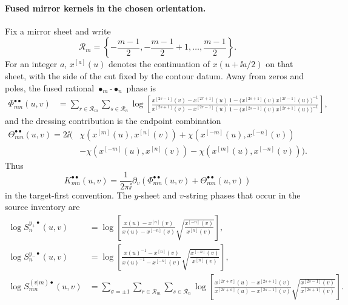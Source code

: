 \paragraph{Fused mirror kernels in the chosen orientation.}
Fix a mirror sheet and write
\[
  \mathcal R_m=
  \left\{-\frac{m-1}{2},-\frac{m-1}{2}+1,\ldots,\frac{m-1}{2}\right\}.
\]
For an integer \(a\), \(x^{[a]}(u)\) denotes the continuation of
\(x(u+\ii a/2)\) on that sheet, with the side of the cut fixed by the
contour datum.  Away from zeros and poles, the fused rational
\(\bullet_m\)-\(\bullet_n\) phase is
\begin{align}
  \Phi^{\bullet\bullet}_{mn}(u,v)
  &=
  \sum_{r\in\mathcal R_m}
  \sum_{s\in\mathcal R_n}
  \log\left[
    \frac{x^{[2s-1]}(v)-x^{[2r+1]}(u)}
         {x^{[2s+1]}(v)-x^{[2r-1]}(u)}
    \frac{1-\bigl(x^{[2s+1]}(v)x^{[2r-1]}(u)\bigr)^{-1}}
         {1-\bigl(x^{[2s-1]}(v)x^{[2r+1]}(u)\bigr)^{-1}}
  \right],
  \label{eq:planar-n4-mirror-bullet-bullet-rational-phase}
\end{align}
and the dressing contribution is the endpoint combination
\begin{align}
  \Theta^{\bullet\bullet}_{mn}(u,v)
  =
  2\ii\bigl(&
  \chi(x^{[m]}(u),x^{[n]}(v))
  +
  \chi(x^{[-m]}(u),x^{[-n]}(v))
  \nonumber\\
  &-
  \chi(x^{[-m]}(u),x^{[n]}(v))
  -
  \chi(x^{[m]}(u),x^{[-n]}(v))
  \bigr).
  \label{eq:planar-n4-mirror-bullet-bullet-dressing-phase}
\end{align}
Thus
\[
  K^{\bullet\bullet}_{mn}(u,v)
  =
  \frac{1}{2\pi\ii}\partial_v
  \left(
    \Phi^{\bullet\bullet}_{mn}(u,v)
    +
    \Theta^{\bullet\bullet}_{mn}(u,v)
  \right)
\]
in the target-first convention.  The \(y\)-sheet and \(v\)-string phases
that occur in the source inventory are
\begin{align}
  \log S^{y_+\bullet}_n(u,v)
  &=
  \log\left[
    \frac{x(u)-x^{[n]}(v)}
         {x(u)-x^{[-n]}(v)}
    \sqrt{\frac{x^{[-n]}(v)}{x^{[n]}(v)}}
  \right],
  \label{eq:planar-n4-mirror-yplus-bullet-phase}\\
  \log S^{y_-\bullet}_n(u,v)
  &=
  \log\left[
    \frac{x(u)^{-1}-x^{[n]}(v)}
         {x(u)^{-1}-x^{[-n]}(v)}
    \sqrt{\frac{x^{[-n]}(v)}{x^{[n]}(v)}}
  \right],
  \label{eq:planar-n4-mirror-yminus-bullet-phase}\\
  \log S^{(v|m)\bullet}_{mn}(u,v)
  &=
  \sum_{\sigma=\pm1}
  \sum_{r\in\mathcal R_m}
  \sum_{s\in\mathcal R_n}
  \log\left[
    \frac{x^{[2r+\sigma]}(u)-x^{[2s+1]}(v)}
         {x^{[2r+\sigma]}(u)-x^{[2s-1]}(v)}
    \sqrt{\frac{x^{[2s-1]}(v)}{x^{[2s+1]}(v)}}
  \right].
  \label{eq:planar-n4-mirror-v-bullet-phase}
\end{align}
